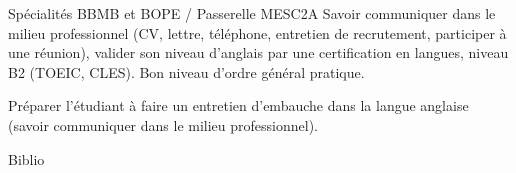 \documentclass[10pt, a5paper]{report}
\begin{document}
\vfill
\module[codeApogee={SOM2IP00},
titre={Ouverture à l'international}, 
COURS={}, 
TD={12}, 
TP={}, 
CTD={},
CTP={}, 
TOTAL={12}, 
SEMESTRE={Semestre 2}, 
COEFF={1}, 
ECTS={1}, 
nomPremierResp={Lupka Mihajlovska}, 
emailPremierResp={lupka.mihajlovska@univ-orleans.fr}, 
nomSecondResp={}, 
emailSecondResp={}, 
langue={Anglais}, 
nbPrerequis={1}, 
descriptionCourte={true}, 
descriptionLongue={true}, 
objectifs={true}, 
ressources={false}, 
bibliographie={false}] 
{
Spécialités BBMB et BOPE / Passerelle MESC2A
} 
{
Savoir communiquer dans le milieu professionnel (CV, lettre, téléphone, entretien de recrutement, participer à une réunion), valider son niveau d’anglais par une certification en langues, niveau B2 (TOEIC, CLES).
}
{Bon niveau d’ordre général pratique.
} 
{\begin{itemize} 
  \ObjItem Préparer l’étudiant à faire un entretien  d’embauche dans la langue anglaise (savoir communiquer dans le milieu professionnel).
\end{itemize} 
} 
{} 
{Biblio}
 
\end{document}
